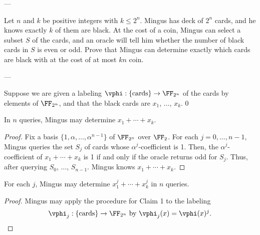 
---

Let $n$ and $k$ be positive integers with $k\le2^n$.
Mingus has deck of $2^n$ cards, and he knows exactly $k$
of them are black.
At the cost of a coin, Mingus can select a subset $S$ of the cards,
and an oracle will tell him whether the number of black cards in $S$ 
is even or odd.
Prove that Mingus can determine exactly which cards are black
with at the cost of at most $kn$ coin.

---

Suppose we are given a labeling $\vphi:\{\text{cards}\}\to\FF_{2^n}$
of the cards by elements of $\FF_{2^n}$,
and that the black cards are $x_1$, $\ldots$, $x_k$.
\setcounter{claim}0
\begin{claim}
    In $n$ queries, Mingus may determine $x_1+\cdots+x_k$.
\end{claim}
\begin{proof}
    Fix a basis $\{1,\alpha,\ldots,\alpha^{n-1}\}$ of $\FF_{2^n}$ over $\FF_2$.
    For each $j=0,\ldots,n-1$, Mingus queries the set $S_j$ of cards
    whose $\alpha^j$-coefficient is 1. 
    Then, the $\alpha^j$-coefficient of $x_1+\cdots+x_k$ is 1 if and only if
    the oracle returns odd for $S_j$.
    Thus, after querying $S_0$, $\ldots$, $S_{n-1}$.
    Mingus knows $x_1+\cdots+x_k$.
\end{proof}
\begin{claim}
    For each $j$, Mingus may determine $x_1^j+\cdots+x_k^j$
    in $n$ queries.
\end{claim}
\begin{proof}
    Mingus may apply the procedure for Claim 1
    to the labeling \[\vphi_j:\{\text{cards}\}\to\FF_{2^n}$
    by $\vphi_j(x)=\vphi(x)^j.\qedhere\]
\end{proof}

